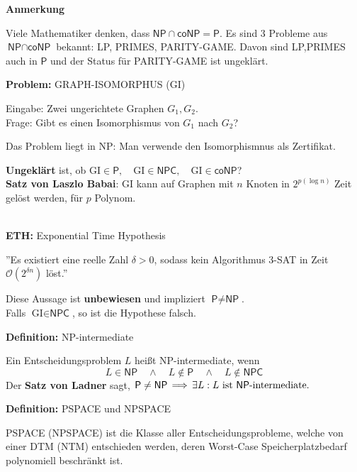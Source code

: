 \documentclass[a4paper,graphics,11pt]{article}
\begin{document}
\newpage

\textbf{Anmerkung}

Viele Mathematiker denken, dass $\textsf{NP} \cap \textsf{coNP} = \textsf{P}$. Es sind 3 Probleme
aus $\textsf{NP} \cap\textsf{coNP}$ bekannt: LP, PRIMES, PARITY-GAME. Davon sind LP,PRIMES auch in $\textsf{P}$
und der Status für PARITY-GAME ist ungeklärt.

\strut

\textbf{Problem:} GRAPH-ISOMORPHUS (GI)

Eingabe: Zwei ungerichtete Graphen $G_1, G_2$.
\\[5pt]
Frage: Gibt es einen Isomorphismus von $G_1$ nach $G_2$?

Das Problem liegt in \textsf{NP}: Man verwende den Isomorphismnus als Zertifikat.

\textbf{Ungeklärt} ist, ob $\text{GI} \in \textsf{P},\quad \text{GI} \in \textsf{NPC},\quad \text{GI} \in \textsf{coNP}$?
\\[20pt]
\textbf{Satz von Laszlo Babai}: GI kann auf Graphen mit $n$ Knoten in $2^{p(\log n)}$ Zeit gelöst werden,
für $p$ Polynom.

\strut\\

\textbf{ETH:} Exponential Time Hypothesis

''Es existiert eine reelle Zahl $\delta > 0$,
sodass kein Algorithmus 3-SAT in Zeit $\mathcal{O}(2^{\delta n})$ löst.''

Diese Aussage ist \textbf{unbewiesen} und impliziert $\textsf{P} \neq \textsf{NP}$.\\
Falls $\text{GI} \in \textsf{NPC}$, so ist die Hypothese falsch.

\strut

\textbf{Definition:} \textsf{NP}-intermediate

Ein Entscheidungsproblem $L$ heißt \textsf{NP}-intermediate, wenn
$$
    L \in \textsf{NP} \quad \land \quad L \notin \textsf{P} \quad \land \quad L \notin \textsf{NPC}
$$
Der \textbf{Satz von Ladner} sagt,
$\textsf{P} \neq \textsf{NP} \,\Longrightarrow\, \exists L: L \text{ ist \textsf{NP}-intermediate.}$

\strut

\textbf{Definition:} \textsf{PSPACE} und \textsf{NPSPACE}

\textsf{PSPACE} (\textsf{NPSPACE}) ist die Klasse aller Entscheidungsprobleme, welche von einer
DTM (NTM) entschieden werden, deren Worst-Case Speicherplatzbedarf polynomiell beschränkt ist.
\end{document}

